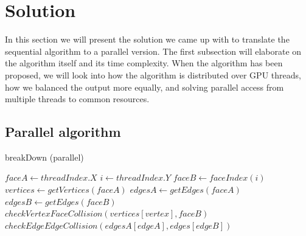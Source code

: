\section{Solution}
In this section we will present the solution we came up with to translate the sequential algorithm to a parallel version. The first subsection will elaborate on the algorithm itself and its time complexity. When the algorithm has been proposed, we will look into how the algorithm is distributed over GPU threads, how we balanced the output more equally, and solving parallel access from multiple threads to common resources.

\subsection{Parallel algorithm}

\begin{algorithm}
\caption{breakDown (parallel)}\label{breakpar}
\begin{algorithmic}[1]
    \State $faceA \gets threadIndex.X$
    \State $i \gets threadIndex.Y$
    \State $faceB \gets faceIndex(i)$ 
    \State $vertices \gets getVertices(faceA)$
    \State $edgesA \gets getEdges(faceA)$
    \State $edgesB \gets getEdges(faceB)$
            \State $checkVertexFaceCollision(vertices[vertex], faceB)$
        \EndFor
                    \State $checkEdgeEdgeCollision(edgesA[edgeA], edges[edgeB])$
                \EndIf
            \EndFor
        \EndFor
\EndProcedure
\end{algorithmic}
\end{algorithm}

